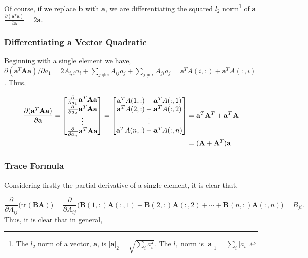 \documentclass[11pt]{amsart}
\begin{document}
Of course, if we replace $\mathbf{b}$ with $\mathbf{a}$, we are differentiating the squared $l_2$ norm\footnote{The $l_2$ norm of a vector, $\mathbf{a}$, is $|\mathbf{a}|_2 = \sqrt{\sum_i a_i^2}$. The $l_1$ norm is $|\mathbf{a}|_1 = \sum_i |a_i|$.} of $\mathbf{a}$ $\frac{\partial(\mathbf{a}^T\mathbf{a})}{\partial\mathbf{a}} = 2\mathbf{a}$.

\subsubsection{Differentiating a Vector Quadratic}

Beginning with a single element we have, $\partial(\mathbf{a}^T\mathbf{A}\mathbf{a})/\partial a_1 = 2A_{i, i}a_i + \sum_{j \neq i} A_{ij}a_j + \sum_{j \neq i} A_{ji}a_j = \mathbf{a}^TA(i, :) + \mathbf{a}^TA(:, i)$. Thus,

\begin{align}
\frac{\partial(\mathbf{a}^T\mathbf{A}\mathbf{a})}{\partial\mathbf{a}} =
\begin{bmatrix}
\frac{\partial}{\partial a_1} \mathbf{a}^T\mathbf{A}\mathbf{a} \\
\frac{\partial}{\partial a_2} \mathbf{a}^T\mathbf{A}\mathbf{a} \\
\vdots \\
\frac{\partial}{\partial a_n} \mathbf{a}^T\mathbf{A}\mathbf{a} \\
\end{bmatrix}
=
\begin{bmatrix}
\mathbf{a}^TA(1, :) + \mathbf{a}^TA(:, 1) \\
\mathbf{a}^TA(2, :) + \mathbf{a}^TA(:, 2) \\
\vdots \\
\mathbf{a}^TA(n, :) + \mathbf{a}^TA(:, n) \\
\end{bmatrix}
&= \mathbf{a}^T\mathbf{A}^T + \mathbf{a}^T\mathbf{A} \notag \\
&= (\mathbf{A} + \mathbf{A}^T)\mathbf{a} \notag
\end{align}

\subsubsection{Trace Formula}

Considering firstly the partial derivative of a single element, it is clear that,

$$\frac{\partial}{\partial A_{ij}}\big(\text{tr}(\mathbf{B}\mathbf{A})\big) = \frac{\partial}{\partial A_{ij}}\big(\mathbf{B}(1, :)\mathbf{A}(:, 1) + \mathbf{B}(2, :)\mathbf{A}(:, 2) + \cdots + \mathbf{B}(n, :)\mathbf{A}(:, n)\big) = B_{ji}.$$ Thus, it is clear that in general, 
\end{document}
